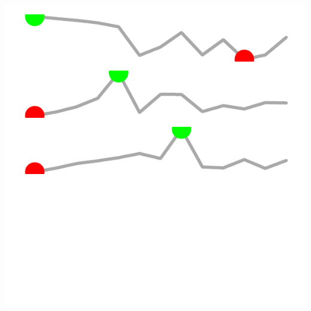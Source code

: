 \documentclass{article}\usepackage[]{graphicx}\usepackage[]{color}
\makeatletter
\def\maxwidth{ %
  \ifdim\Gin@nat@width>\linewidth
    \linewidth
  \else
    \Gin@nat@width
  \fi
}
\makeatother
\begin{document}
\begin{minipage}[c]{0.875\textwidth}
\begin{minipage}[c]{0.11\textwidth}
{\centering \includegraphics[width=\maxwidth]{figure/sparklines_Finance-1} 

}



      \vspace*{-0.5cm}
    \end{minipage}
\end{minipage}
  
\end{document}
